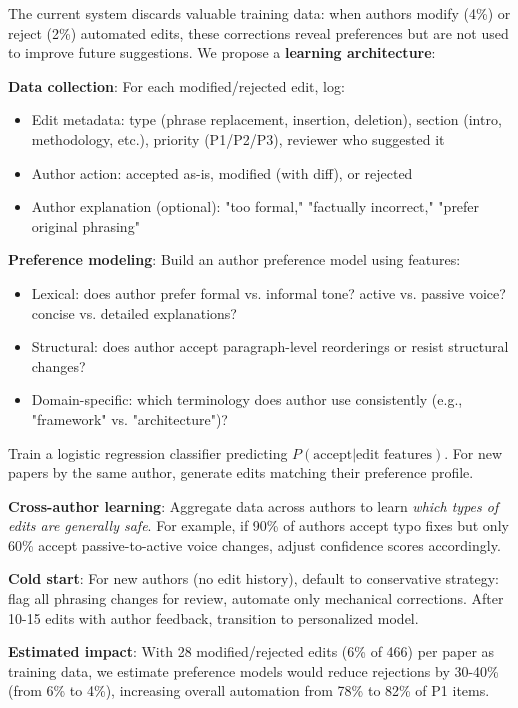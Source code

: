 The current system discards valuable training data: when authors modify (4\%) or reject (2\%) automated edits, these corrections reveal preferences but are not used to improve future suggestions. We propose a \textbf{learning architecture}:

\textbf{Data collection}: For each modified/rejected edit, log:
\begin{itemize}
\item Edit metadata: type (phrase replacement, insertion, deletion), section (intro, methodology, etc.), priority (P1/P2/P3), reviewer who suggested it
\item Author action: accepted as-is, modified (with diff), or rejected
\item Author explanation (optional): "too formal," "factually incorrect," "prefer original phrasing"
\end{itemize}

\textbf{Preference modeling}: Build an author preference model using features:
\begin{itemize}
\item Lexical: does author prefer formal vs. informal tone? active vs. passive voice? concise vs. detailed explanations?
\item Structural: does author accept paragraph-level reorderings or resist structural changes?
\item Domain-specific: which terminology does author use consistently (e.g., "framework" vs. "architecture")?
\end{itemize}

Train a logistic regression classifier predicting $P(\text{accept} | \text{edit features})$. For new papers by the same author, generate edits matching their preference profile.

\textbf{Cross-author learning}: Aggregate data across authors to learn \textit{which types of edits are generally safe}. For example, if 90\% of authors accept typo fixes but only 60\% accept passive-to-active voice changes, adjust confidence scores accordingly.

\textbf{Cold start}: For new authors (no edit history), default to conservative strategy: flag all phrasing changes for review, automate only mechanical corrections. After 10-15 edits with author feedback, transition to personalized model.

\textbf{Estimated impact}: With 28 modified/rejected edits (6\% of 466) per paper as training data, we estimate preference models would reduce rejections by 30-40\% (from 6\% to 4\%), increasing overall automation from 78\% to 82\% of P1 items.

